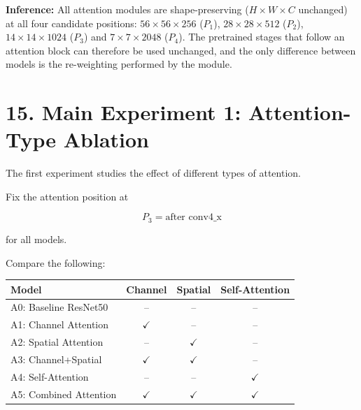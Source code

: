 \documentclass[10pt]{article}
\begin{document}
\textbf{Inference:} All attention modules are shape-preserving ($H\times W\times C$ unchanged) at all four candidate
positions: $56\times56\times256$ ($P_1$), $28\times28\times512$ ($P_2$), $14\times14\times1024$ ($P_3$) and
$7\times7\times2048$ ($P_4$). The pretrained stages that follow an attention block can therefore be
used unchanged, and the only difference between models is the re-weighting performed by the module.

\section*{15. Main Experiment 1: Attention-Type Ablation}

The first experiment studies the effect of different types of attention.

Fix the attention position at

\[
\boxed{
P_3=\text{after conv4\_x}
}
\]

for all models.

Compare the following:

\begin{center}

\begin{tabular}{|l|c|c|c|}
\hline

\textbf{Model}
&
\textbf{Channel}
&
\textbf{Spatial}
&
\textbf{Self-Attention}
\\
\hline

A0: Baseline ResNet50
&
--
&
--
&
--
\\
\hline

A1: Channel Attention
&
$\checkmark$
&
--
&
--
\\
\hline

A2: Spatial Attention
&
--
&
$\checkmark$
&
--
\\
\hline

A3: Channel+Spatial
&
$\checkmark$
&
$\checkmark$
&
--
\\
\hline

A4: Self-Attention
&
--
&
--
&
$\checkmark$
\\
\hline

A5: Combined Attention
&
$\checkmark$
&
$\checkmark$
&
$\checkmark$
\\
\hline

\end{tabular}

\end{center}
\end{document}
